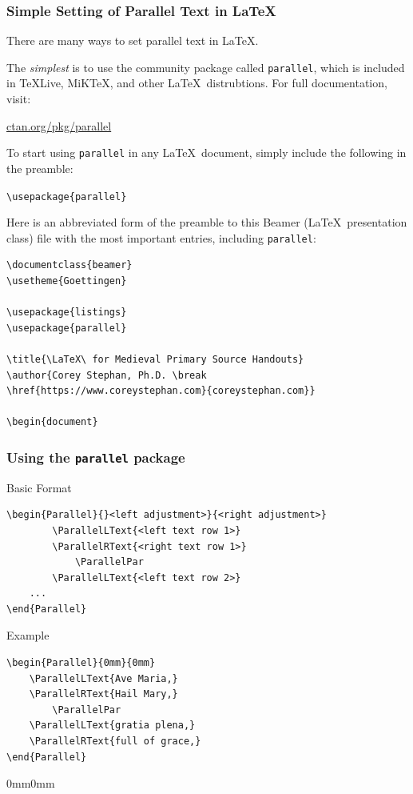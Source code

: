 \documentclass{beamer}
\begin{document}
\begin{frame}[fragile]
	\frametitle[Simple Parallel Text]{Simple Setting of Parallel Text in \LaTeX}
There are many ways to set parallel text in \LaTeX. \break

The \emph{simplest} is to use the community package called \texttt{parallel}, which is included in TeXLive, MiKTeX, and other \LaTeX\ distrubtions. For full documentation, visit: \break 

\href{https://ctan.org/pkg/parallel}{ctan.org/pkg/parallel} \break

To start using \texttt{parallel} in any \LaTeX\ document, simply include the following in the preamble: \break
 
\verb|\usepackage{parallel}| \break
\end{frame}

\begin{frame}[fragile]
Here is an abbreviated form of the preamble to this Beamer (\LaTeX\ presentation class) file with the most important entries, including \texttt{parallel}: \break

{\scriptsize \begin{lstlisting}
\documentclass{beamer}
\usetheme{Goettingen}

\usepackage{listings}
\usepackage{parallel}

\title{\LaTeX\ for Medieval Primary Source Handouts}
\author{Corey Stephan, Ph.D. \break 
\href{https://www.coreystephan.com}{coreystephan.com}}

\begin{document}
\end{lstlisting}}
\end{frame}

\begin{frame}[fragile]
	\frametitle[Using parallel]{Using the \texttt{parallel} package}

Basic Format

{\scriptsize \begin{lstlisting}
\begin{Parallel}{}<left adjustment>}{<right adjustment>}
		\ParallelLText{<left text row 1>}
		\ParallelRText{<right text row 1>}
			\ParallelPar
		\ParallelLText{<left text row 2>}
	...	
\end{Parallel}	
\end{lstlisting}}

Example
	
{\scriptsize \begin{lstlisting}
\begin{Parallel}{0mm}{0mm}
	\ParallelLText{Ave Maria,}
	\ParallelRText{Hail Mary,}
		\ParallelPar
	\ParallelLText{gratia plena,}
	\ParallelRText{full of grace,}
\end{Parallel}	
		\end{lstlisting}}

\begin{Parallel}{0mm}{0mm}
\ParallelPar
{}
\end{Parallel}	

\end{frame}
\end{document}
